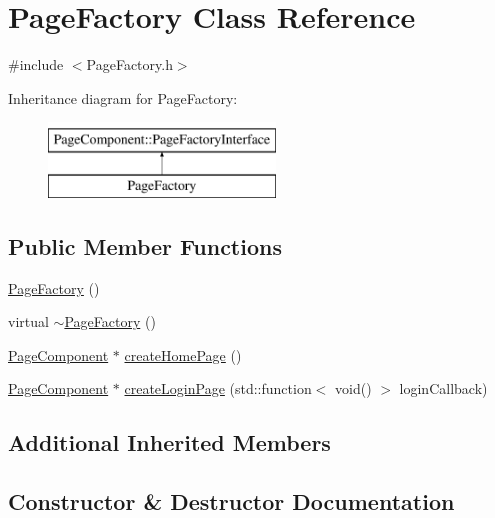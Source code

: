 \hypertarget{classPageFactory}{}\section{Page\+Factory Class Reference}
\label{classPageFactory}


{\ttfamily \#include $<$Page\+Factory.\+h$>$}

Inheritance diagram for Page\+Factory\+:\begin{figure}[H]
\begin{center}
\leavevmode
\includegraphics[height=2.000000cm]{classPageFactory}
\end{center}
\end{figure}
\subsection*{Public Member Functions}
\begin{DoxyCompactItemize}
\item 
\mbox{\hyperlink{classPageFactory_aefe63d515d040a6ad96b00d611a1abfb}{Page\+Factory}} ()
\item 
virtual \mbox{\hyperlink{classPageFactory_a62d5a5ddeff01c924c98556cf87aa64d}{$\sim$\+Page\+Factory}} ()
\item 
\mbox{\hyperlink{classPageComponent}{Page\+Component}} $\ast$ \mbox{\hyperlink{classPageFactory_a08f1a7c80349bcd20a6aadeb75c4f9ac}{create\+Home\+Page}} ()
\item 
\mbox{\hyperlink{classPageComponent}{Page\+Component}} $\ast$ \mbox{\hyperlink{classPageFactory_aa00448c458c43a9931023c30b3821670}{create\+Login\+Page}} (std\+::function$<$ void() $>$ login\+Callback)
\end{DoxyCompactItemize}
\subsection*{Additional Inherited Members}


\subsection{Constructor \& Destructor Documentation}
\mbox{\label{classPageFactory_aefe63d515d040a6ad96b00d611a1abfb}} 
